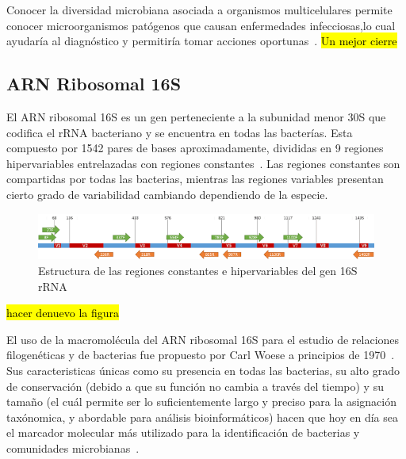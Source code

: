 Conocer la diversidad microbiana asociada a organismos multicelulares permite conocer microorganismos patógenos que causan enfermedades infecciosas,lo cual ayudaría al diagnóstico y permitiría tomar acciones oportunas~\cite{yan2018municipal,rackaityte2020human}. 
\hl{Un mejor cierre}
\subsection{ARN Ribosomal 16S}
El ARN ribosomal 16S es un gen perteneciente a la subunidad menor 30S que codifica el rRNA bacteriano y se encuentra en todas las bacterías. 
Esta compuesto por 1542 pares de bases aproximadamente, divididas en 9 regiones hipervariables entrelazadas con regiones constantes~\cite{clarridge2004impact}.
Las regiones constantes son compartidas por todas las bacterias, mientras las regiones variables presentan cierto grado de variabilidad cambiando dependiendo de la especie. 



\begin{figure}[H]
    \centering
    \includegraphics[width=1\linewidth]{images/16S.png}
    \caption{Estructura de las regiones constantes e hipervariables del gen 16S rRNA}
    \label{fig:16S_structure}
\end{figure}

\hl{hacer denuevo la figura}

El uso de la macromolécula del ARN ribosomal  16S para el estudio de relaciones filogenéticas y de bacterias fue propuesto por Carl Woese a principios de 1970~\cite{olsen1993ribosomal}.
Sus caracteristicas únicas como su presencia en todas las bacterias, su alto grado de conservación (debido a que su función no cambia a través del tiempo) y su tamaño (el cuál permite ser lo suficientemente largo y preciso para la asignación taxónomica, y abordable para análisis bioinformáticos) hacen que hoy en día sea el marcador molecular más utilizado para la identificación de bacterias y comunidades microbianas~\cite{reller2007detection,janda200716s,lopez2023determining,patel200116s}.


